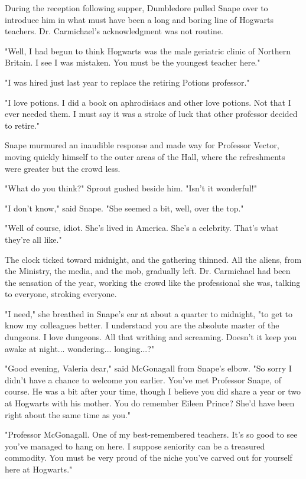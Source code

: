 \documentclass[a4paper,11pt]{article}
\begin{document}
During the reception following supper, Dumbledore pulled Snape over to introduce him in what must have been a long and boring line of Hogwarts teachers. Dr. Carmichael's acknowledgment was not routine.

"Well, I had begun to think Hogwarts was the male geriatric clinic of Northern Britain. I see I was mistaken. You must be the youngest teacher here."

"I was hired just last year to replace the retiring Potions professor."

"I love potions. I did a book on aphrodisiacs and other love potions. Not that I ever needed them. I must say it was a stroke of luck that other professor decided to retire."

Snape murmured an inaudible response and made way for Professor Vector, moving quickly himself to the outer areas of the Hall, where the refreshments were greater but the crowd less.

"What do you think?" Sprout gushed beside him. "Isn't it wonderful!"

"I don't know," said Snape. "She seemed a bit, well, over the top."

"Well of course, idiot. She's lived in America. She's a celebrity. That's what they're all like."

The clock ticked toward midnight, and the gathering thinned. All the aliens, from the Ministry, the media, and the mob, gradually left. Dr. Carmichael had been the sensation of the year, working the crowd like the professional she was, talking to everyone, stroking everyone.

"I need," she breathed in Snape's ear at about a quarter to midnight, "to get to know my colleagues better. I understand you are the absolute master of the dungeons. I love dungeons. All that writhing and screaming. Doesn't it keep you awake at night... wondering... longing...?"

"Good evening, Valeria dear," said McGonagall from Snape's elbow. "So sorry I didn't have a chance to welcome you earlier. You've met Professor Snape, of course. He was a bit after your time, though I believe you did share a year or two at Hogwarts with his mother. You do remember Eileen Prince? She'd have been right about the same time as you."

"Professor McGonagall. One of my best-remembered teachers. It's so good to see you've managed to hang on here. I suppose seniority can be a treasured commodity. You must be very proud of the niche you've carved out for yourself here at Hogwarts."
\end{document}
